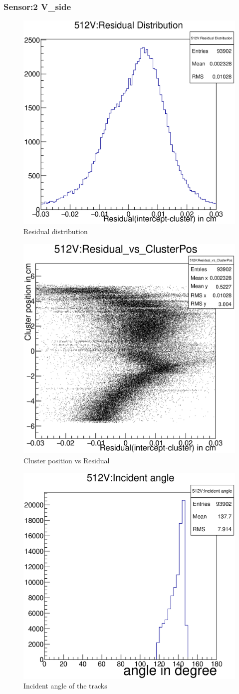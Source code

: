 \documentclass[12pt]{article}
\begin{document}
				\subsubsection{Sensor:2 V\_side}
				\begin{multicols}{3}
					\begin{figure}[H]
						\includegraphics[width=.3\textwidth]{512V:residualplot.eps}	
						\caption{Residual distribution}	
						\label{fig1}	
					\end{figure}
					\begin{figure}[H]
						\includegraphics[width=.3\textwidth]{512V:residual_vs_clusterpos.eps}	
						\caption{Cluster position vs Residual}	
						\label{fig2}	
					\end{figure}
					\begin{figure}[H]
						\includegraphics[width=.3\textwidth]{512V:incident_angle.eps}	
						\caption{Incident angle of the tracks}	
						\label{fig2}	
					\end{figure}
				\end{multicols}
				
\end{document}
